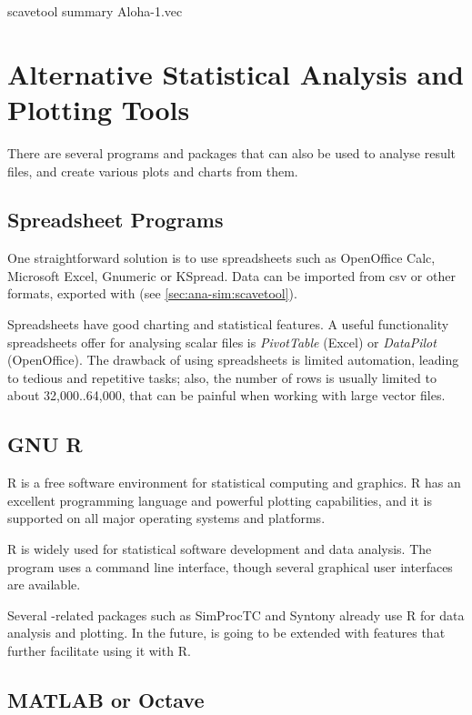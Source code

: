\begin{commandline}
scavetool summary Aloha-1.vec
\end{commandline}


\section{Alternative Statistical Analysis and Plotting Tools}

There are several programs and packages that can also be used to analyse
result files, and create various plots and charts from them.


\subsection{Spreadsheet Programs}

One straightforward solution is to use spreadsheets such as OpenOffice
Calc, Microsoft Excel, Gnumeric or KSpread. Data can be imported from csv
or other formats, exported with  (see
\ref{sec:ana-sim:scavetool}).

Spreadsheets have good charting and statistical features. A useful
functionality spreadsheets offer for analysing scalar files is
\textit{PivotTable} (Excel) or \textit{DataPilot} (OpenOffice). The
drawback of using spreadsheets is limited automation, leading to tedious
and repetitive tasks; also, the number of rows is usually limited to about
32,000..64,000, that can be painful when working with large vector files.


\subsection{GNU R}
\label{sec:ana-sim:gnu-r}

R is a free software environment for statistical computing and graphics.
R has an excellent programming language and powerful plotting capabilities,
and it is supported on all major operating systems and platforms.

R is widely used for statistical software development and data analysis.
The program uses a command line interface, though several graphical user
interfaces are available.

Several {\opp}-related packages such as SimProcTC and Syntony already
use R for data analysis and plotting. In the future, {\opp} is going
to be extended with features that further facilitate using it with R.


\subsection{MATLAB or Octave}

